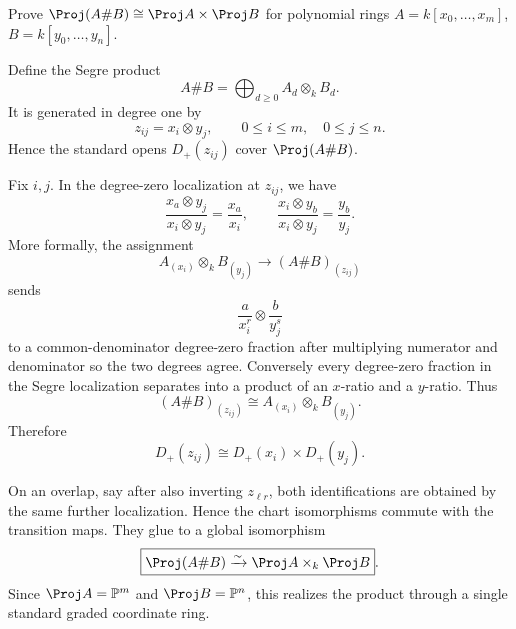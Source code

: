 \begin{problem}\label{prob:vi38-08}
Prove \(\Proj(A\#B)\cong\Proj A\times\Proj B\) for polynomial rings \(A=k[x_0,\ldots,x_m]\), \(B=k[y_0,\ldots,y_n]\).
\end{problem}

\ifdefined\FullProblemDossiers
\begin{solution}
Define the Segre product
\[
A\#B=\bigoplus_{d\ge0}A_d\otimes_kB_d.
\]
It is generated in degree one by
\[
z_{ij}=x_i\otimes y_j,
\qquad 0\le i\le m,
\quad 0\le j\le n.
\]
Hence the standard opens \(D_+(z_{ij})\) cover \(\Proj(A\#B)\).

Fix \(i,j\).  In the degree-zero localization at \(z_{ij}\), we have
\[
\frac{x_a\otimes y_j}{x_i\otimes y_j}=\frac{x_a}{x_i},
\qquad
\frac{x_i\otimes y_b}{x_i\otimes y_j}=\frac{y_b}{y_j}.
\]
More formally, the assignment
\[
A_{(x_i)}\otimes_kB_{(y_j)}
\longrightarrow
(A\#B)_{(z_{ij})}
\]
sends
\[
\frac{a}{x_i^r}\otimes\frac{b}{y_j^s}
\]
to a common-denominator degree-zero fraction after multiplying numerator and
denominator so the two degrees agree.  Conversely every degree-zero fraction in
the Segre localization separates into a product of an \(x\)-ratio and a
\(y\)-ratio. Thus
\[
\boxed{(A\#B)_{(z_{ij})}\cong A_{(x_i)}\otimes_kB_{(y_j)}}.
\]
Therefore
\[
D_+(z_{ij})
\cong
D_+(x_i)\times D_+(y_j).
\]

On an overlap, say after also inverting \(z_{\ell r}\), both identifications are
obtained by the same further localization. Hence the chart isomorphisms commute
with the transition maps.  They glue to a global isomorphism
\[
\boxed{\Proj(A\#B)\xrightarrow{\sim}\Proj A\times_k\Proj B}.
\]
Since \(\Proj A=\mathbb P^m\) and \(\Proj B=\mathbb P^n\), this realizes the product
through a single standard graded coordinate ring.
\end{solution}
\fi
